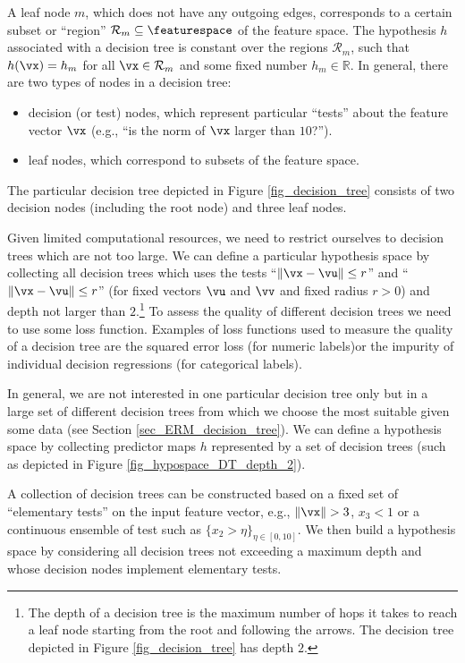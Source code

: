 \documentclass[12pt]{report}
\begin{document}
A leaf node $m$, which does not have any outgoing edges, corresponds to a certain 
subset or ``region'' $\mathcal{R}_{m} \subseteq \featurespace$ of the feature space. 
The hypothesis $h$ associated with a decision tree is constant over the regions $\mathcal{R}_{m}$, 
such that $h(\vx) = h_{m}$ for all $\vx \in \mathcal{R}_{m}$ and some fixed number $h_{m} \in \mathbb{R}$. 
In general, there are two types of nodes in a decision tree: 
\begin{itemize} 
\item decision (or test) nodes, which represent particular ``tests'' 
about the feature vector $\vx$ (e.g., ``is the norm of $\vx$ larger than $10$?'').
\item leaf nodes, which correspond to subsets of the feature space. 
\end{itemize} 
The particular decision tree depicted in Figure \ref{fig_decision_tree} consists 
of two decision nodes (including the root node) and three leaf nodes. 

Given limited computational resources, we need to restrict ourselves to decision 
trees which are not too large. We can define a particular hypothesis space by 
collecting all decision trees which uses the tests ``$\| \vx - \vu \| \leq r$'' and  
``$\| \vx - \vu \| \leq r$''  (for fixed vectors $\vu$ and $\vv$ and fixed radius $r >0$) 
and depth not larger than $2$.\footnote{The depth of a decision tree is the maximum 
	number of hops it takes to reach a leaf node starting from the root and following 
	the arrows. The decision tree depicted in Figure \ref{fig_decision_tree} has depth $2$.} 
To assess the quality of different decision trees we need to use some loss function. 
Examples of loss functions used to measure the quality of a decision tree are the 
squared error loss (for numeric labels)or the impurity of individual decision 
regressions (for categorical labels). 

In general, we are not interested in one particular decision tree only but 
in a large set of different decision trees from which we choose the most 
suitable given some data (see Section \ref{sec_ERM_decision_tree}). We 
can define a hypothesis space by collecting predictor maps $h$ represented 
by a set of decision trees (such as depicted in Figure \ref{fig_hypospace_DT_depth_2}). 

A collection of decision trees can be constructed based on a fixed set of 
``elementary tests'' on the input feature vector, e.g., $\| \vx \| > 3$, $x_{3} < 1$ 
or a continuous ensemble of test such as $\{ x_{2} > \eta \}_ {\eta \in [0,10]}$. We then 
build a hypothesis space by considering all decision trees not exceeding a maximum 
depth and whose decision nodes implement elementary tests. 
\end{document}
